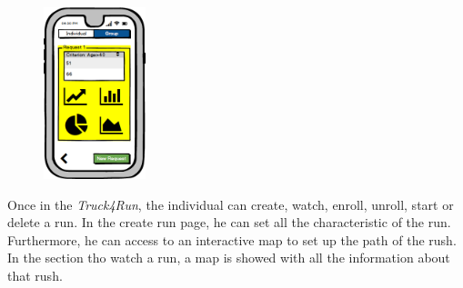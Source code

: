 \documentclass[a4paper]{article}
\begin{document}
\begin{figure}[!htpb]
    	\includegraphics[height=50mm]{images/mockups/ViewData2.png}
    	\newline
        \end{figure}
        
\newpage
        
Once in the \textit{Truck4Run}, the individual can create, watch, enroll, unroll, start or delete a run. 
\newline
In the create run page, he can set all the characteristic of the run. Furthermore, he can access to an interactive map to set up the path of the rush.
\newline
In the section tho watch a run, a map is showed with all the information about that rush.
\end{document}
